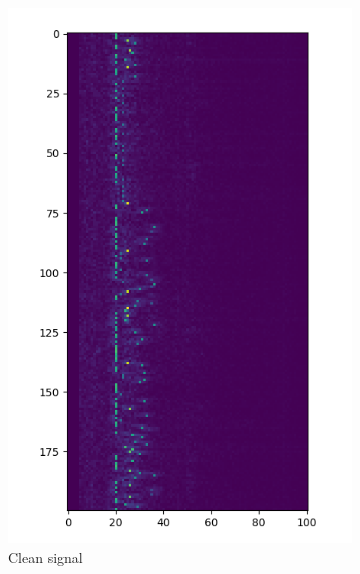 \documentclass[a4paper]{article}
\begin{document}
\begin{figure}[H]
    \centering
    \begin{subfigure}{0.45\textwidth}
        \includegraphics[width=\textwidth]{waterfall_sync_clean.png}
        \caption{Clean signal}
    \end{subfigure}
    \begin{subfigure}{0.45\textwidth}

\end{subfigure}
\end{figure}
\end{document}
